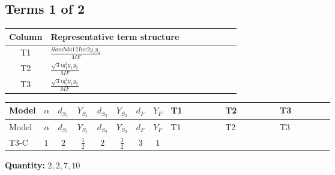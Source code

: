 \documentclass[8pt]{article}
\begin{document}
\begin{landscape}
\subsection*{Terms 1 of 2}
\begin{center}
\begin{tabular}{@{}c >{\raggedright\arraybackslash}p{0.82\linewidth}@{}}
\toprule
Column & Representative term structure \\
\midrule
T1 & \(\displaystyle \frac{i lambda12Inv2 \overline{y_{1}} \overline{y_{2}}}{MF}\) \\
\midrule
T2 & \(\displaystyle \frac{\sqrt{3} i g_{1}^{2} \overline{y_{1}} \overline{y_{2}}}{MF}\) \\
\midrule
T3 & \(\displaystyle \frac{\sqrt{3} i g_{2}^{2} \overline{y_{1}} \overline{y_{2}}}{MF}\) \\
\midrule
\bottomrule
\end{tabular}
\end{center}
\smallskip
\tiny
\begin{longtable}{@{}llcccccc >{\raggedright\arraybackslash}p{0.21\linewidth} >{\raggedright\arraybackslash}p{0.21\linewidth} >{\raggedright\arraybackslash}p{0.21\linewidth}@{}}
\toprule
Model & $\alpha$ & $d_{S_1}$ & $Y_{S_1}$ & $d_{S_2}$ & $Y_{S_2}$ & $d_F$ & $Y_F$ & T1 & T2 & T3 \\
\midrule
\endfirsthead
\toprule
Model & $\alpha$ & $d_{S_1}$ & $Y_{S_1}$ & $d_{S_2}$ & $Y_{S_2}$ & $d_F$ & $Y_F$ & T1 & T2 & T3 \\
\midrule
\endhead
T3-C & $1$ & $2$ & $\frac{1}{2}$ & $2$ & $\frac{3}{2}$ & $3$ & $1$ & \scriptsize\adjustbox{max width=\linewidth}{$\begin{gathered} - \frac{i lambda12Inv2 \overline{y_{1}} \overline{y_{2}}}{3 MF}\end{gathered}$} & \scriptsize\adjustbox{max width=\linewidth}{$\begin{gathered} - \frac{\sqrt{3} i g_{1}^{2} \overline{y_{1}} \overline{y_{2}}}{2 MF}\end{gathered}$} & \scriptsize\adjustbox{max width=\linewidth}{$\begin{gathered} - \frac{\sqrt{3} i g_{2}^{2} \overline{y_{1}} \overline{y_{2}}}{4 MF}\end{gathered}$} \\
\midrule
\bottomrule
\end{longtable}
\clearpage
\noindent\textbf{Quantity: }$\mathrm{2,2,7,10}$\par\smallskip

\end{landscape}
\end{document}

